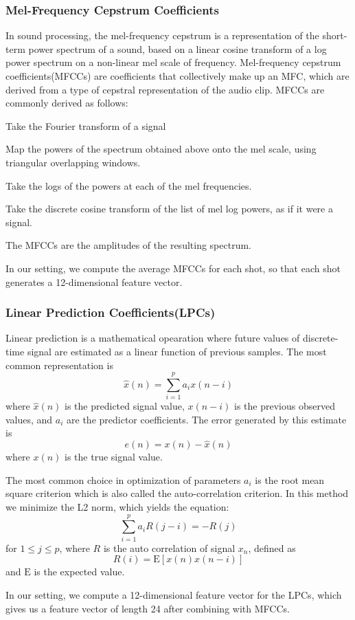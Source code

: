 \subsubsection{Mel-Frequency Cepstrum Coefficients}
In sound processing, the mel-frequency cepstrum is a representation of the short-term power spectrum of a sound, based on a linear cosine transform of a log power spectrum on a non-linear mel scale of frequency. Mel-frequency cepstrum coefficients(MFCCs) are coefficients that collectively make up an MFC, which are derived from a type of cepstral representation of the audio clip. MFCCs are commonly derived as follows:
\begin{enumeration}
\item Take the Fourier transform of a signal
\item Map the powers of the spectrum obtained above onto the mel scale, using triangular overlapping windows.
\item Take the logs of the powers at each of the mel frequencies.
\item Take the discrete cosine transform of the list of mel log powers, as if it were a signal.
\item The MFCCs are the amplitudes of the resulting spectrum.
\end{enumeration}
In our setting, we compute the average MFCCs for each shot, so that each shot generates a 12-dimensional feature vector.
\subsubsection{Linear Prediction Coefficients(LPCs)}
Linear prediction is a mathematical opearation where future values of discrete-time signal are estimated as a linear function of previous samples. The most common representation is 
$$ \hat{x}(n) = \sum_{i=1}^{p} a_i x(n-i)$$
where $\hat{x}(n)$ is the predicted signal value, $x(n-i)$ is the previous observed values, and $a_i$ are the predictor coefficients. The error generated by this estimate is 
$$ e(n) = x(n) - \hat{x}(n)$$
where $x(n)$ is the true signal value. \par
The most common choice in optimization of parameters $a_i$ is the root mean square criterion which is also called the auto-correlation criterion. In this method we minimize the L2 norm, which yields the equation:
$$\sum_{i=1}^{p} a_i R(j-i) = -R(j)$$
for $1 \leq j \leq p$, where $R$ is the auto correlation of signal $x_n$, defined as
$$R(i) = \mathrm{E}[x(n)x(n-i)]$$
and $\mathrm{E}$ is the expected value.\par
In our setting, we compute a 12-dimensional feature vector for the LPCs, which gives us a feature vector of length 24 after combining with MFCCs.


